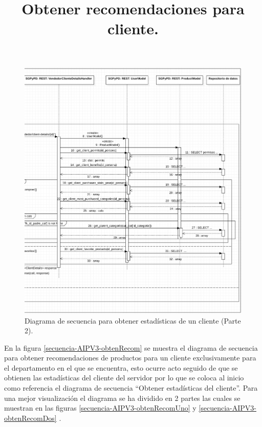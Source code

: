 \FloatBarrier
\begin{figure}[htbp!]
		\centering
			\includegraphics[width=1 \textwidth]{imagenes/adrian/vendedor/prototipo3/detallesCliente2}
		\caption{Diagrama de secuencia para obtener estadísticas de un cliente (Parte 2).}
		\label{secuencia-AIPV3-detallesDos}
\end{figure}
\FloatBarrier

\title{\textbf{Obtener recomendaciones para cliente.}\\}

En la figura \ref{secuencia-AIPV3-obtenRecom} se muestra el diagrama de secuencia para obtener recomendaciones de productos para un cliente exclusivamente para el departamento en el que se encuentra, esto ocurre acto seguido de que se obtienen las estadísticas del cliente del servidor por lo que se coloca al inicio como referencia el diagrama de secuencia ``Obtener estadísticas del cliente''. Para una mejor visualización el diagrama se ha dividido en 2 partes las cuales se muestran en las figuras \ref{secuencia-AIPV3-obtenRecomUno} y \ref{secuencia-AIPV3-obtenRecomDos} .

